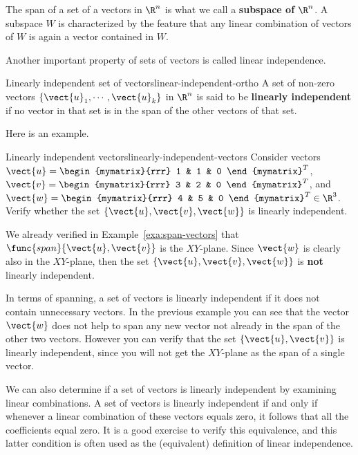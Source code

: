 The span of a set of a vectors in $\R^n$ is what we call a \textbf{subspace of $\R^n$}. A subspace $W$ is characterized by the feature that any linear combination of vectors of $W$ is again a vector contained in $W$. 

Another important property of sets of vectors is called linear independence. 

\begin{definition}{Linearly independent set of vectors}{linear-independent-ortho}
A set of non-zero vectors $\{\vect{u}_1, \cdots ,\vect{u}_k\}$ in $\R^{n}$ is said to be 
\textbf{linearly independent}
 if no vector in that set is in the span of the other vectors of that set.
\end{definition}

Here is an example.  

\begin{example}{Linearly independent vectors}{linearly-independent-vectors}
Consider vectors $\vect{u}=\begin{mymatrix}{rrr}
1  & 1 & 0
\end{mymatrix}^T$, 
$\vect{v}=\begin{mymatrix}{rrr}
3  & 2 & 0
\end{mymatrix}^T$, and
$\vect{w}=\begin{mymatrix}{rrr}
4  & 5 & 0
\end{mymatrix}^T  \in \R^{3}$.
Verify whether the set $\{\vect{u}, \vect{v}, \vect{w}\}$ is linearly independent. 
\end{example}

\begin{solution}
We already verified in Example~\ref{exa:span-vectors} that
$\func{span} \{\vect{u}, \vect{v}\}$ is the $XY$-plane. Since $\vect{w}$
is clearly also in the $XY$-plane, then the set $\{\vect{u}, \vect{v},
\vect{w}\}$ is \textbf{not} linearly independent.
\end{solution}

In terms of spanning, a set of vectors is linearly independent if it
does not contain unnecessary vectors. In the previous example you
can see that the vector $\vect{w}$ does not help to span any new vector
not already in the span of the other two vectors. However you can
verify that the set $\{\vect{u}, \vect{v}\}$ is linearly independent,
since you will not get the $XY$-plane as the span of a single vector.

We can also determine if a set of vectors is linearly independent by examining linear combinations. A set of vectors is linearly independent if and only if
whenever a linear combination of these vectors equals zero, it follows
that all the coefficients equal zero. It is a good exercise to verify
this equivalence, and this latter condition is often used as the
(equivalent) definition of linear independence.

